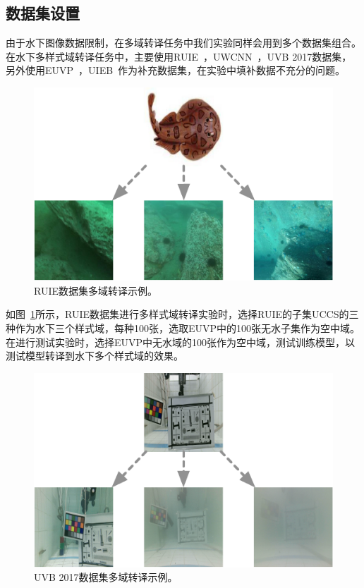 \subsection{数据集设置}
由于水下图像数据限制，在多域转译任务中我们实验同样会用到多个数据集组合。在水下多样式域转译任务中，主要使用RUIE~\cite{liu2019real}，UWCNN~\cite{li2020underwater}，UVB 2017数据集，另外使用EUVP~\cite{islam2019fast}，UIEB~\cite{li2019underwater}作为补充数据集，在实验中填补数据不充分的问题。

\begin{figure}[ht]
    \centering
  \includegraphics[width=\textwidth]{figures/RUIE_dataset_domain.pdf}
  \caption{RUIE数据集多域转译示例。}
  \label{fig:ruie_domain}
\end{figure}

如图~\ref{fig:ruie_domain}所示，RUIE数据集进行多样式域转译实验时，选择RUIE的子集UCCS的三种作为水下三个样式域，每种100张，选取EUVP中的100张无水子集作为空中域。在进行测试实验时，选择EUVP中无水域的100张作为空中域，测试训练模型，以测试模型转译到水下多个样式域的效果。

\begin{figure}[ht]
    \centering
  \includegraphics[width=\textwidth]{figures/UVB_dataset_domain.pdf}
  \caption{UVB 2017数据集多域转译示例。}
  \label{fig:uvb_domain}
\end{figure}

